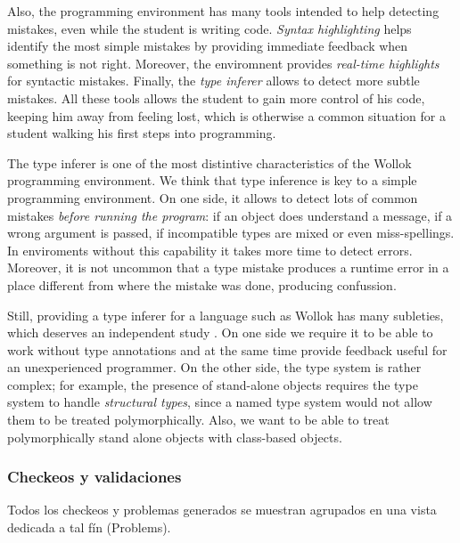 Also, the programming environment has many tools intended to help detecting mistakes, even while the student is writing code.
\emph{Syntax highlighting} helps identify the most simple mistakes by providing immediate feedback when something is not right. 
Moreover, the enviromnent provides \emph{real-time highlights} for syntactic mistakes.
Finally, the \emph{type inferer} allows to detect more subtle mistakes.
All these tools allows the student to gain more control of his code, keeping him away from feeling lost, 
which is otherwise a common situation for a student walking his first steps into programming.


\medskip
The type inferer is one of the most distintive characteristics of the Wollok programming environment.
We think that type inference is key to a simple programming environment.
On one side, it allows to detect lots of common mistakes \emph{before running the program}:
if an object does understand a message, if a wrong argument is passed, if incompatible types are mixed or even miss-spellings.
In enviroments without this capability it takes more time to detect errors.
Moreover, it is not uncommon that a type mistake produces a runtime error in a place different from where the mistake was done, producing confussion.

Still, providing a type inferer for a language such as Wollok has many subleties, which deserves an independent study \cite{type inferer}.
On one side we require it to be able to work without type annotations and at the same time provide feedback useful for an unexperienced programmer.
On the other side, the type system is rather complex;
for example, the presence of stand-alone objects requires the type system to handle \emph{structural types}, since a named type system would not allow them to be treated polymorphically.
Also, we want to be able to treat polymorphically stand alone objects with class-based objects.

\subsubsection{Checkeos y validaciones}
 
Todos los checkeos y problemas
generados se muestran agrupados en una vista dedicada a tal fín (Problems).


